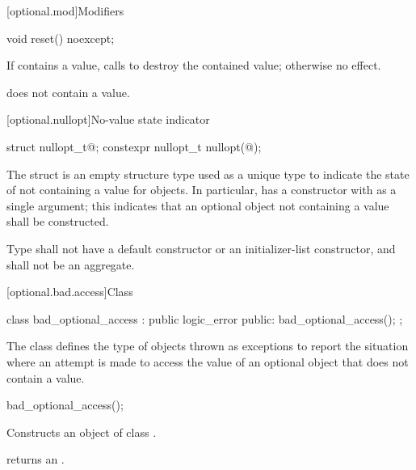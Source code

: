 [optional.mod]{Modifiers}

%
\begin{itemdecl}
void reset() noexcept;
\end{itemdecl}

\begin{itemdescr}
\pnum
\effects
If  contains a value, calls  to destroy the contained value;
otherwise no effect.

\pnum
\postconditions
{} does not contain a value.
\end{itemdescr}

[optional.nullopt]{No-value state indicator}

%
%
\begin{itemdecl}
struct nullopt_t{@\seebelow@};
constexpr nullopt_t nullopt(@\unspec@);
\end{itemdecl}

\pnum
The struct  is an empty structure type used as a unique type to indicate the state of not containing a value for  objects.
In particular,  has a constructor with  as a single argument;
this indicates that an optional object not containing a value shall be constructed.

\pnum
Type  shall not have a default constructor or an initializer-list constructor, and shall not be an aggregate.

[optional.bad.access]{Class }

\begin{codeblock}
class bad_optional_access : public logic_error {
public:
  bad_optional_access();
};
\end{codeblock}

\pnum
The class  defines the type of objects thrown as exceptions to report the situation where an attempt is made to access the value of an optional object that does not contain a value.

%
%
\begin{itemdecl}
bad_optional_access();
\end{itemdecl}

\begin{itemdescr}
\pnum
\effects
Constructs an object of class .

\pnum
\postconditions
{} returns an
\ntbs.
\end{itemdescr}

